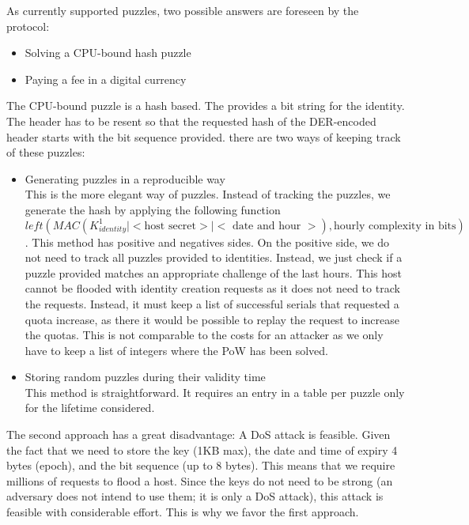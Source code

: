 As currently supported puzzles, two possible answers are foreseen by the protocol:
\begin{itemize}
	\item Solving a CPU-bound hash puzzle 
	\item Paying a fee in a digital currency
\end{itemize}

The CPU-bound puzzle is a hash based. The \VortexNode{} provides a bit string for the identity. The header has to be resent so that the requested hash of the DER-encoded header starts with the bit sequence provided. there are two ways of keeping track of these puzzles:

\begin{itemize}
	\item Generating puzzles in a reproducible way\\
	This is the more elegant way of puzzles. Instead of tracking the puzzles, we generate the hash by applying the following function $left(MAC(K^1_{identity} | <\text{host secret}> | <\text{ date and hour }>),\text{hourly complexity in bits})$. This method has positive and negatives sides. On the positive side, we do not need to track all puzzles provided to identities. Instead, we just check if a puzzle provided matches an appropriate challenge of the last hours. This host cannot be flooded with identity creation requests as it does not need to track the requests. Instead, it must keep a list of successful serials that requested a quota increase, as there it would be possible to replay the request to increase the quotas. This is not comparable to the costs for an attacker as we only have to keep a list of integers where the PoW has been solved.
	\item Storing random puzzles during their validity time\\
	This method is straightforward. It requires an entry in a table per puzzle only for the lifetime considered. 
\end{itemize}

The second approach has a great disadvantage: A DoS attack is feasible. Given the fact that we need to store the key (1KB max), the date and time of expiry 4 bytes (epoch), and the bit sequence (up to 8 bytes). This means that we require millions of requests to flood a host. Since the keys do not need to be strong (an adversary does not intend to use them; it is only a DoS attack), this attack is feasible with considerable effort. This is why we favor the first approach.

